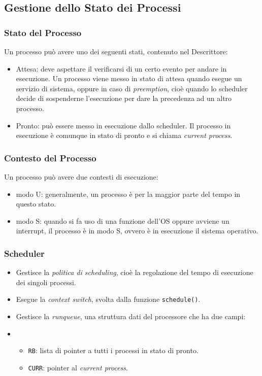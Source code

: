 \documentclass[10pt,a4paper]{article}
\newcommand{\code}{\texttt}
\begin{document}
    \subsection{Gestione dello Stato dei Processi}
    \subsubsection{Stato del Processo}
    Un processo può avere uno dei seguenti stati, contenuto nel Descrittore:
    \begin{itemize}
        \item Attesa: deve aspettare il verificarsi di un certo evento per andare in esecuzione. Un processo viene messo in stato di attesa quando esegue un servizio di sistema, oppure in caso di \emph{preemption}, cioè quando lo scheduler decide di sospenderne l'esecuzione per dare la precedenza ad un altro processo.
        \item Pronto: può essere messo in esecuzione dallo scheduler. Il processo in esecuzione è comunque in stato di pronto e si chiama \emph{current process}.
    \end{itemize}
    \subsubsection{Contesto del Processo}
    Un processo può avere due contesti di esecuzione:
    \begin{itemize}
        \item modo U: generalmente, un processo è per la maggior parte del tempo in questo stato.
        \item modo S: quando si fa uso di una funzione dell'OS oppure avviene un interrupt, il processo è in modo S, ovvero è in esecuzione il sistema operativo.
    \end{itemize}
    \subsubsection{Scheduler}
    \begin{itemize}
        \item Gestisce la \emph{politica di scheduling}, cioè la regolazione del tempo di esecuzione dei singoli processi.
        \item Esegue la \emph{context switch}, svolta dalla funzione \code{schedule()}.
        \item Gestisce la \emph{runqueue}, una struttura dati del processore che ha due campi:
        \item \begin{itemize}
            \item \code{RB}: lista di pointer a tutti i processi in stato di pronto.
            \item \code{CURR}: pointer al \emph{current process}.
        \end{itemize}
    \end{itemize}
\end{document}
